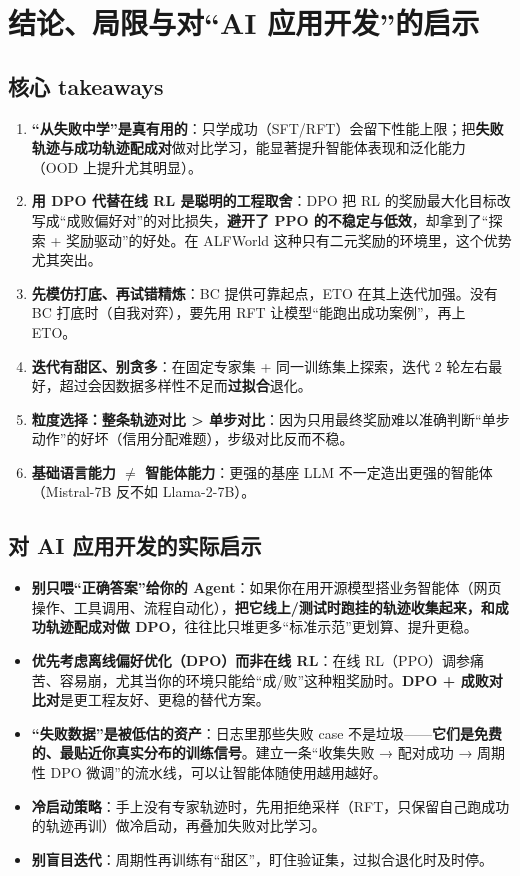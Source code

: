 \documentclass[11pt,UTF8,fontset=fandol]{ctexart}
\begin{document}
\section{结论、局限与对“AI 应用开发”的启示}

\subsection{核心 takeaways}

\begin{enumerate}[leftmargin=2em,itemsep=4pt]
\item \textbf{“从失败中学”是真有用的}：只学成功（SFT/RFT）会留下性能上限；把\textbf{失败轨迹与成功轨迹配成对}做对比学习，能显著提升智能体表现和泛化能力（OOD 上提升尤其明显）。
\item \textbf{用 DPO 代替在线 RL 是聪明的工程取舍}：DPO 把 RL 的奖励最大化目标改写成“成败偏好对”的对比损失，\textbf{避开了 PPO 的不稳定与低效}，却拿到了“探索 + 奖励驱动”的好处。在 ALFWorld 这种只有二元奖励的环境里，这个优势尤其突出。
\item \textbf{先模仿打底、再试错精炼}：BC 提供可靠起点，ETO 在其上迭代加强。没有 BC 打底时（自我对弈），要先用 RFT 让模型“能跑出成功案例”，再上 ETO。
\item \textbf{迭代有甜区、别贪多}：在固定专家集 + 同一训练集上探索，迭代 2 轮左右最好，超过会因数据多样性不足而\textbf{过拟合}退化。
\item \textbf{粒度选择：整条轨迹对比 > 单步对比}：因为只用最终奖励难以准确判断“单步动作”的好坏（信用分配难题），步级对比反而不稳。
\item \textbf{基础语言能力 $\neq$ 智能体能力}：更强的基座 LLM 不一定造出更强的智能体（Mistral-7B 反不如 Llama-2-7B）。
\end{enumerate}

\subsection{对 AI 应用开发的实际启示}

\begin{itemize}[leftmargin=2em,itemsep=4pt]
\item \textbf{别只喂“正确答案”给你的 Agent}：如果你在用开源模型搭业务智能体（网页操作、工具调用、流程自动化），\textbf{把它线上/测试时跑挂的轨迹收集起来，和成功轨迹配成对做 DPO}，往往比只堆更多“标准示范”更划算、提升更稳。
\item \textbf{优先考虑离线偏好优化（DPO）而非在线 RL}：在线 RL（PPO）调参痛苦、容易崩，尤其当你的环境只能给“成/败”这种粗奖励时。\textbf{DPO + 成败对比对}是更工程友好、更稳的替代方案。
\item \textbf{“失败数据”是被低估的资产}：日志里那些失败 case 不是垃圾——\textbf{它们是免费的、最贴近你真实分布的训练信号}。建立一条“收集失败 → 配对成功 → 周期性 DPO 微调”的流水线，可以让智能体随使用越用越好。
\item \textbf{冷启动策略}：手上没有专家轨迹时，先用拒绝采样（RFT，只保留自己跑成功的轨迹再训）做冷启动，再叠加失败对比学习。
\item \textbf{别盲目迭代}：周期性再训练有“甜区”，盯住验证集，过拟合退化时及时停。
\end{itemize}
\end{document}
